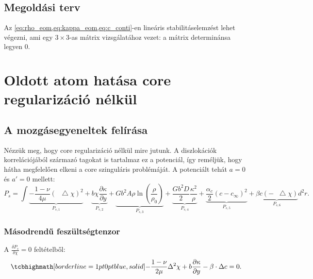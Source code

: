 \documentclass[10pt,a4paper]{scrartcl}
\newcommand*\Laplace{\mathop{}\!\mathbin\bigtriangleup}
\begin{document}
\subsection{Megoldási terv}
Az \cref{eq:rho_eom,eq:kappa_eom,eq:c_conti}-en lineáris stabilitáselemzést lehet végezni, ami egy $3\times3$-as mátrix vizsgálatához vezet: a mátrix determinánsa legyen 0.



\section{Oldott atom hatása core regularizáció nélkül}
\subsection{A mozgásegyeneltek felírása}
Nézzük meg, hogy core regularizáció nélkül mire jutunk. A diszlokációk korrelációjából származó tagokat is tartalmaz ez a potenciál, így reméljük, hogy hátha megfelelően elkeni a core szinguláris problémáját. A potenciált tehát $a=0$ és $a'=0$ mellett:
\begin{equation} \label{eq:plastic_pot_wo_core_reg}
P_s = \int { \underbrace{- \frac{{1 - \nu }}{{4\mu }}{{\left( {\Laplace\chi } \right)}^2}}_{P_{s,1}} + \underbrace{b\chi \frac{{\partial \kappa }}{{\partial y}}}_{P_{s,2}} + \underbrace{G{b^2}A\rho \ln \left( {\frac{\rho }{{{\rho _0}}}} \right)}_{P_{s,3}} + \underbrace{\frac{{G{b^2}D}}{2}\frac{{{\kappa ^2}}}{\rho }}_{P_{s,4}} + \underbrace{\frac{\alpha_c}{2} {\left( {c - {c_\infty }} \right)^2}}_{P_{s,5}} + \underbrace{\beta c\left(- {\Laplace\chi } \right)}_{P_{s,6}}}{d^2}r.
\end{equation}
\subsubsection{Másodrendű feszültségtenzor}
A $\frac{{\delta {P_s}}}{{\delta \chi }} = 0$ feltételből:
\begin{equation} \label{eq:chi}
\tcbhighmath[borderline={1pt}{0pt}{blue,solid}]{- \frac{{1 - \nu }}{{2\mu }}{\Delta ^2}\chi  + b\frac{{\partial \kappa }}{{\partial y}} - \beta  \cdot \Delta c = 0.}
\end{equation}
\end{document}
